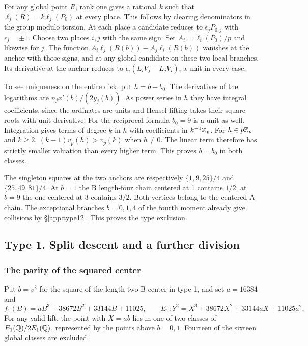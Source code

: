 For any global point \(R\), rank one gives a rational \(k\) such that
\(\ell_j(R)=k\ell_j(P_0)\) at every place. This follows by clearing
denominators in the group modulo torsion. At each place a candidate
reduces to \(\epsilon_jP_{0,j}\) with \(\epsilon_j=\pm1\). Choose two
places \(i,j\) with the same sign. Set \(A_i=\ell_i(P_0)/p\) and likewise
for \(j\). The function \(A_i\ell_j(R(b))-A_j\ell_i(R(b))\) vanishes
at the anchor with those signs, and at any global candidate on these
two local branches. Its derivative at the anchor reduces to
\(\epsilon_i(L_iV_j-L_jV_i)\), a unit in every case.

To see uniqueness on the entire disk, put \(h=b-b_0\). The derivatives
of the logarithms are \(n_j x'(b)/(2y_j(b))\). As power series in \(h\)
they have integral coefficients, since the ordinates are units and
Hensel lifting takes their square roots with unit derivative. For the
reciprocal formula \(b_0=9\) is a unit as well. Integration gives terms
of degree \(k\) in \(h\) with coefficients in \(k^{-1}\mathbb Z_p\).
For \(h\in p\mathbb Z_p\) and \(k\ge2\),
\((k-1)v_p(h)>v_p(k)\) when \(h\ne0\). The linear term therefore has
strictly smaller valuation than every higher term. This proves
\(b=b_0\) in both classes.

The singleton squares at the two anchors are respectively
\(\{1,9,25\}/4\) and \(\{25,49,81\}/4\).
At \(b=1\) the B length-four chain centered at 1 contains \(1/2\); at
\(b=9\) the one centered at 3 contains \(3/2\). Both vertices belong to
the centered A chain. The exceptional branches \(b=0,1,4\) of the fourth
moment already give collisions by \S\ref{app:type12}. This proves the type exclusion.

\subsection{Type 1. Split descent and a further division}\label{detail:type1}

\subsubsection{The parity of the squared center}\label{arith:63}

Put \(b=v^2\) for the square of the length-two B
center in type 1, and set \(a=16384\) and
\[f_1(B)=aB^3+38672B^2+33144B+11025,\qquad
 E_1:Y^2=X^3+38672X^2+33144aX+11025a^2.\]
For any valid lift, the point with \(X=ab\) lies in one of two classes
of \(E_1(\mathbb Q)/2E_1(\mathbb Q)\), represented by the points above
\(b=0,1\). Fourteen of the sixteen global classes are excluded.

